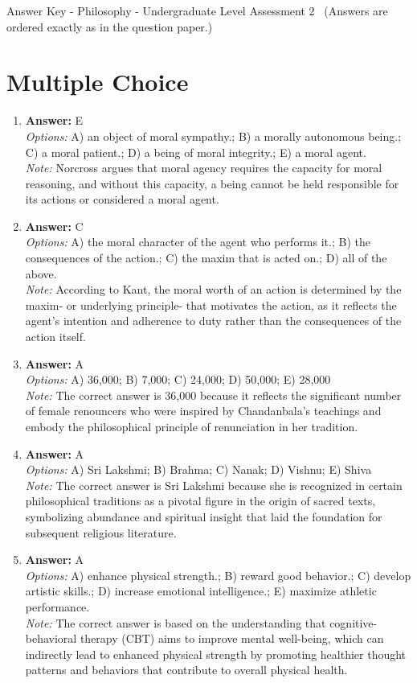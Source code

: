 \documentclass[12pt]{article}
\begin{document}
\begin{center}
Answer Key - Philosophy - Undergraduate Level Assessment 2 \
\small (Answers are ordered exactly as in the question paper.)
\end{center}

\section*{Multiple Choice}
\begin{enumerate}[label=\arabic*.]
\item \textbf{Answer:} E
\\ \textit{Options:} A) an object of moral sympathy.; B) a morally autonomous being.; C) a moral patient.; D) a being of moral integrity.; E) a moral agent.
\\ \textit{Note:} Norcross argues that moral agency requires the capacity for moral reasoning, and without this capacity, a being cannot be held responsible for its actions or considered a moral agent.
\item \textbf{Answer:} C
\\ \textit{Options:} A) the moral character of the agent who performs it.; B) the consequences of the action.; C) the maxim that is acted on.; D) all of the above.
\\ \textit{Note:} According to Kant, the moral worth of an action is determined by the maxim- or underlying principle- that motivates the action, as it reflects the agent's intention and adherence to duty rather than the consequences of the action itself.
\item \textbf{Answer:} A
\\ \textit{Options:} A) 36,000; B) 7,000; C) 24,000; D) 50,000; E) 28,000
\\ \textit{Note:} The correct answer is 36,000 because it reflects the significant number of female renouncers who were inspired by Chandanbala's teachings and embody the philosophical principle of renunciation in her tradition.
\item \textbf{Answer:} A
\\ \textit{Options:} A) Sri Lakshmi; B) Brahma; C) Nanak; D) Vishnu; E) Shiva
\\ \textit{Note:} The correct answer is Sri Lakshmi because she is recognized in certain philosophical traditions as a pivotal figure in the origin of sacred texts, symbolizing abundance and spiritual insight that laid the foundation for subsequent religious literature.
\item \textbf{Answer:} A
\\ \textit{Options:} A) enhance physical strength.; B) reward good behavior.; C) develop artistic skills.; D) increase emotional intelligence.; E) maximize athletic performance.
\\ \textit{Note:} The correct answer is based on the understanding that cognitive-behavioral therapy (CBT) aims to improve mental well-being, which can indirectly lead to enhanced physical strength by promoting healthier thought patterns and behaviors that contribute to overall physical health.
\end{enumerate}
\end{document}
